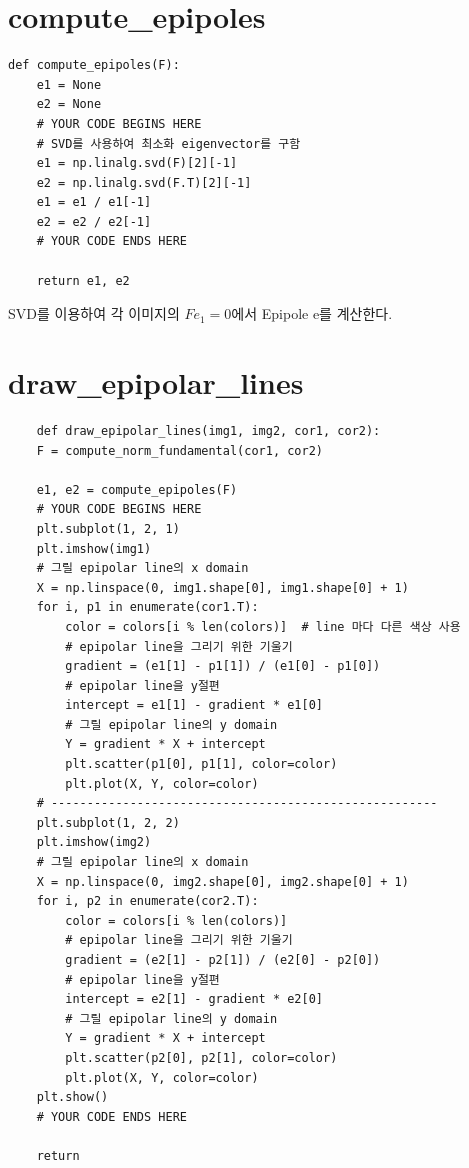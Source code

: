 \documentclass[]{report}
\begin{document}
\section{compute\_epipoles}

\begin{lstlisting}
def compute_epipoles(F):
	e1 = None
	e2 = None
	# YOUR CODE BEGINS HERE
	# SVD를 사용하여 최소화 eigenvector를 구함
	e1 = np.linalg.svd(F)[2][-1]
	e2 = np.linalg.svd(F.T)[2][-1]
	e1 = e1 / e1[-1]
	e2 = e2 / e2[-1]
	# YOUR CODE ENDS HERE
	
	return e1, e2
\end{lstlisting}

SVD를 이용하여 각 이미지의 $ Fe_1 = 0 $에서 Epipole e를 계산한다.  \\


\section{draw\_epipolar\_lines}

\begin{lstlisting}
	def draw_epipolar_lines(img1, img2, cor1, cor2):
    F = compute_norm_fundamental(cor1, cor2)

    e1, e2 = compute_epipoles(F)
    # YOUR CODE BEGINS HERE
    plt.subplot(1, 2, 1)
    plt.imshow(img1)
    # 그릴 epipolar line의 x domain
    X = np.linspace(0, img1.shape[0], img1.shape[0] + 1)
    for i, p1 in enumerate(cor1.T):
        color = colors[i % len(colors)]  # line 마다 다른 색상 사용
        # epipolar line을 그리기 위한 기울기
        gradient = (e1[1] - p1[1]) / (e1[0] - p1[0])
        # epipolar line을 y절편
        intercept = e1[1] - gradient * e1[0]
        # 그릴 epipolar line의 y domain
        Y = gradient * X + intercept
        plt.scatter(p1[0], p1[1], color=color)
        plt.plot(X, Y, color=color)
    # ------------------------------------------------------
    plt.subplot(1, 2, 2)
    plt.imshow(img2)
    # 그릴 epipolar line의 x domain
    X = np.linspace(0, img2.shape[0], img2.shape[0] + 1)
    for i, p2 in enumerate(cor2.T):
        color = colors[i % len(colors)]
        # epipolar line을 그리기 위한 기울기
        gradient = (e2[1] - p2[1]) / (e2[0] - p2[0])
        # epipolar line을 y절편
        intercept = e2[1] - gradient * e2[0]
        # 그릴 epipolar line의 y domain
        Y = gradient * X + intercept
        plt.scatter(p2[0], p2[1], color=color)
        plt.plot(X, Y, color=color)
    plt.show()
    # YOUR CODE ENDS HERE

    return
\end{lstlisting}
\end{document}
